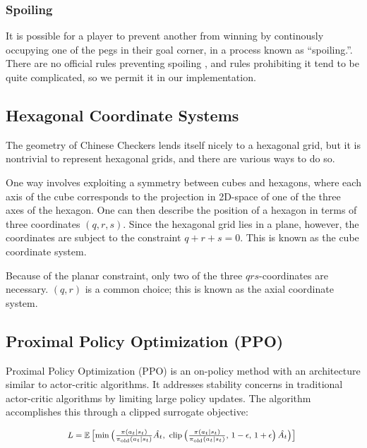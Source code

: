 \documentclass[12pt, a4paper, twocolumn]{article}
\begin{document}
\subsubsection{Spoiling}
It is possible for a player to prevent another from winning by continously occupying one of the pegs in their goal corner, in a process known as ``spoiling.''. There are no official rules preventing spoiling \cite{ChineseCheckersRules}, and rules prohibiting it tend to be quite complicated, so we permit it in our implementation.

\subsection{Hexagonal Coordinate Systems}

The geometry of Chinese Checkers lends itself nicely to a hexagonal grid, but it is nontrivial to represent hexagonal grids, and there are various ways to do so. \cite{HexagonalCoordinates}

One way involves exploiting a symmetry between cubes and hexagons, where each axis of the cube corresponds to the projection in 2D-space of one of the three axes of the hexagon. One can then describe the position of a hexagon in terms of three coordinates $(q, r, s)$. Since the hexagonal grid lies in a plane, however, the coordinates are subject to the constraint $q + r + s = 0$. This is known as the cube coordinate system.

Because of the planar constraint, only two of the three $qrs$-coordinates are necessary. $(q, r)$ is a common choice; this is known as the axial coordinate system.

\subsection{Proximal Policy Optimization (PPO)}

Proximal Policy Optimization\cite{PPO} (PPO) is an on-policy method with an architecture similar to actor-critic algorithms. It addresses stability concerns in traditional actor-critic algorithms by limiting large policy updates. The algorithm accomplishes this through a clipped surrogate objective:

  $$
  \mbox{\footnotesize
  $L = \mathbb{E}\left[\min\left(\frac{\pi(a_t | s_t)}{\pi_{\text{old}}(a_t | s_t)} \hat{A_t}, \text{ clip}\left(\frac{\pi(a_t | s_t)}{\pi_{\text{old}}(a_t | s_t)},\, 1 - \epsilon,\, 1 + \epsilon \right) \hat{A_t}\right)\right]$
  }
  $$
\end{document}
